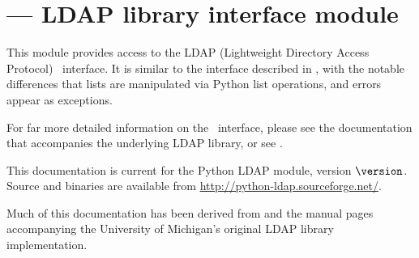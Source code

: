 

\section{ ---
         LDAP library interface module}







This module provides access to the LDAP
(Lightweight Directory Access Protocol) \C\ interface. 
It is similar to the interface described in ,
with the notable differences that lists are manipulated via Python
list operations, and errors appear as exceptions.

For far more detailed information on the \C\ interface, 
please see the documentation that accompanies the underlying
LDAP \C library, or see .

This documentation is current for the Python LDAP module, version
$\version$.
Source and binaries are available from
\url{http://python-ldap.sourceforge.net/}.

Much of this documentation has been derived from  and
the manual pages accompanying the University of Michigan's original
LDAP library implementation.


